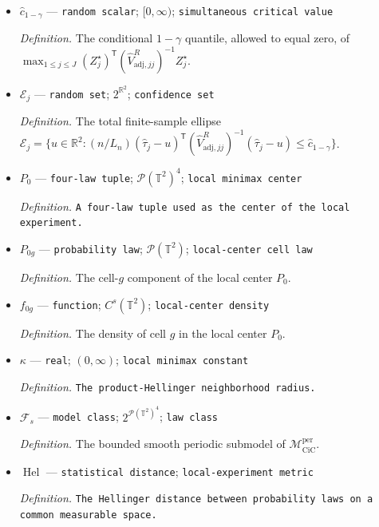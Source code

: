 \documentclass{article}
\begin{document}
\begin{itemize}
  \item \(\widehat c_{1-\gamma}\) --- \texttt{random scalar}; \([0,\infty)\); \texttt{simultaneous critical value}
  \par\smallskip\noindent\emph{Definition.} The conditional \(1-\gamma\) quantile, allowed to equal zero, of \(\max_{1\le j\le J}(Z_j^\star)^{\mathsf T}(\widehat V_{\mathrm{adj},jj}^{R})^{-1}Z_j^\star\).
  \item \(\mathcal E_j\) --- \texttt{random set}; \(2^{\mathbb R^2}\); \texttt{confidence set}
  \par\smallskip\noindent\emph{Definition.} The total finite-sample ellipse \(\mathcal E_j=\{u\in\mathbb R^2:(n/L_n)(\widehat\tau_j-u)^{\mathsf T}(\widehat V_{\mathrm{adj},jj}^{R})^{-1}(\widehat\tau_j-u)\le\widehat c_{1-\gamma}\}\).
  \item \(P_0\) --- \texttt{four-\allowbreak{}law tuple}; \(\mathcal P(\mathbb T^2)^4\); \texttt{local minimax center}
  \par\smallskip\noindent\emph{Definition.} \texttt{A four-\allowbreak{}law tuple used as the center of the local experiment.}
  \item \(P_{0g}\) --- \texttt{probability law}; \(\mathcal P(\mathbb T^2)\); \texttt{local-\allowbreak{}center cell law}
  \par\smallskip\noindent\emph{Definition.} The cell-\(g\) component of the local center \(P_0\).
  \item \(f_{0g}\) --- \texttt{function}; \(C^s(\mathbb T^2)\); \texttt{local-\allowbreak{}center density}
  \par\smallskip\noindent\emph{Definition.} The density of cell \(g\) in the local center \(P_0\).
  \item \(\kappa\) --- \texttt{real}; \((0,\infty)\); \texttt{local minimax constant}
  \par\smallskip\noindent\emph{Definition.} \texttt{The product-\allowbreak{}Hellinger neighborhood radius.}
  \item \(\mathcal F_s\) --- \texttt{model class}; \(2^{\mathcal P(\mathbb T^2)^4}\); \texttt{law class}
  \par\smallskip\noindent\emph{Definition.} The bounded smooth periodic submodel of \(\mathcal M_{\mathrm{CiC}}^{\mathrm{per}}\).
  \item \(\operatorname{Hel}\) --- \texttt{statistical distance}; \texttt{local-\allowbreak{}experiment metric}
  \par\smallskip\noindent\emph{Definition.} \texttt{The Hellinger distance between probability laws on a common measurable space.}

\end{itemize}
\end{document}

